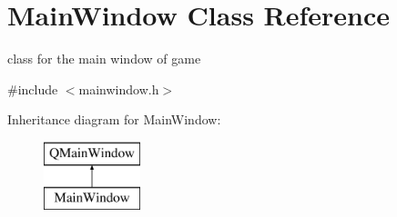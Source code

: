 \hypertarget{class_main_window}{}\section{Main\+Window Class Reference}
\label{class_main_window}


class for the main window of game  




{\ttfamily \#include $<$mainwindow.\+h$>$}

Inheritance diagram for Main\+Window\+:\begin{figure}[H]
\begin{center}
\leavevmode
\includegraphics[height=2.000000cm]{class_main_window}
\end{center}
\end{figure}
